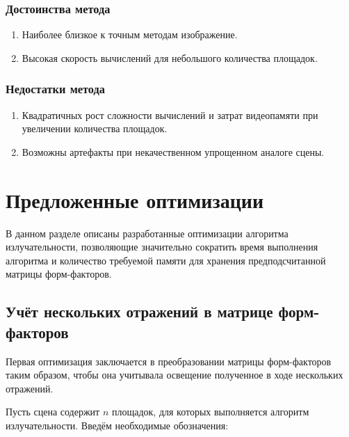 \documentclass[12pt,fleqn]{article}
\begin{document}
\subsubsection{Достоинства метода}

\begin{enumerate}

\item Наиболее близкое к точным методам изображение.

\item Высокая скорость вычислений для небольшого количества площадок.

\end{enumerate}

\subsubsection{Недостатки метода}

\begin{enumerate}

\item Квадратичных рост сложности вычислений и затрат видеопамяти при увеличении количества площадок.

\item Возможны артефакты при некачественном упрощенном аналоге сцены.

\end{enumerate}

\pagebreak

\section{Предложенные оптимизации}

В данном разделе описаны разработанные оптимизации алгоритма излучательности, позволяющие значительно сократить время выполнения алгоритма и количество требуемой памяти для хранения предподсчитанной матрицы форм-факторов.

\subsection{Учёт нескольких отражений в матрице форм-факторов}

Первая оптимизация заключается в преобразовании матрицы форм-факторов таким образом, чтобы она учитывала освещение полученное в ходе нескольких отражений.

Пусть сцена содержит $n$ площадок, для которых выполняется алгоритм излучательности. Введём необходимые обозначения:
\end{document}
